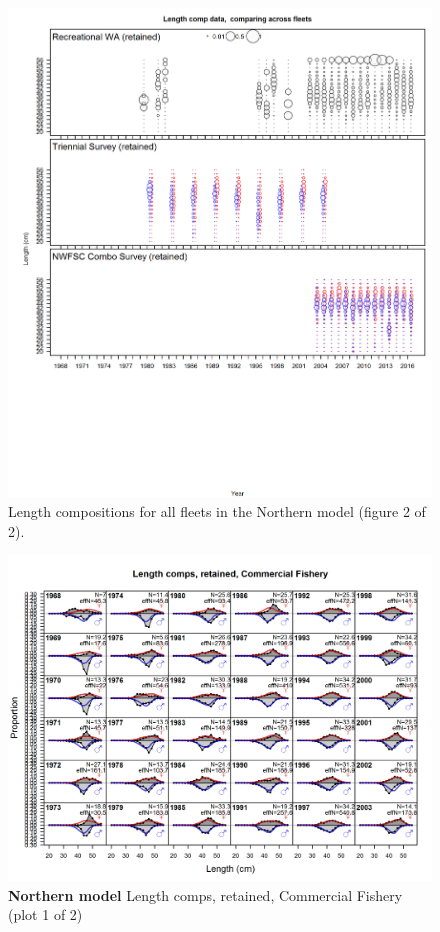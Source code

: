 \documentclass[12pt,]{article}
\begin{document}
\begin{figure}[htbp]
\centering
\includegraphics{r4ss/plots_mod1/comp_lendat__page2_multi-fleet_comparison.png}
\caption{Length compositions for all fleets in the Northern model
(figure 2 of 2). \label{fig:comp_length_bubble_mod1_page2}}
\end{figure}

\FloatBarrier

\newpage

\begin{figure}[htbp]
\centering
\includegraphics{./r4ss/plots_mod1/comp_lenfit_flt1mkt2_page1.png}
\caption{\textbf{Northern model} Length comps, retained, Commercial
Fishery (plot 1 of 2) \label{fig:mod1_1_comp_lenfit_flt1mkt2_page1}}
\end{figure}
\end{document}
